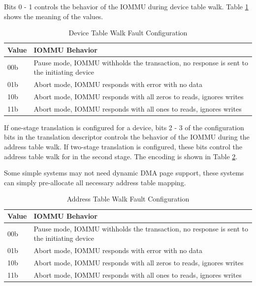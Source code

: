 Bits 0 - 1 controls the behavior of the IOMMU during device table walk. Table
\ref{tbl:dev_tbl_walk_conf} shows the meaning of the values.

\begin{table}[h!t]
    \centering
    \begin{tabular}{ | l | l | }

    \hline
    Value  &  IOMMU Behavior  \\
    \hline
    00b  &  Pause mode, IOMMU withholds the transaction, no response is sent to the initiating device  \\
    \hline
    01b &   Abort mode, IOMMU responds with error with no data  \\
    \hline
    10b &   Abort mode, IOMMU responds with all zeros to reads, ignores writes  \\
    \hline
    11b &   Abort mode, IOMMU responds with all ones to reads, ignores writes  \\
    \hline

    \end{tabular}
    \caption{Device Table Walk Fault Configuration}
    \label{tbl:dev_tbl_walk_conf}
\end{table}

If one-stage translation is configured for a device, bits 2 - 3 of the configuration bits
in the translation descriptor controls the behavior of the IOMMU during the address table
walk. If two-stage translation is configured, these bits control the address table walk
for in the second stage. The encoding is shown in Table \ref{tbl:addr_tbl_walk_conf}.

\note Some simple systems may not need dynamic DMA page support, these systems can simply
pre-allocate all necessary address table mapping. \noteend

\begin{table}[h!t]
    \centering
    \begin{tabular}{ | l | l | }

    \hline
    Value  &  IOMMU Behavior  \\
    \hline
    00b  &  Pause mode, IOMMU withholds the transaction, no response is sent to the initiating device  \\
    \hline
    01b &   Abort mode, IOMMU responds with error with no data  \\
    \hline
    10b &   Abort mode, IOMMU responds with all zeros to reads, ignores writes  \\
    \hline
    11b &   Abort mode, IOMMU responds with all ones to reads, ignores writes  \\
    \hline

    \end{tabular}
    \caption{Address Table Walk Fault Configuration}
    \label{tbl:addr_tbl_walk_conf}
\end{table}

